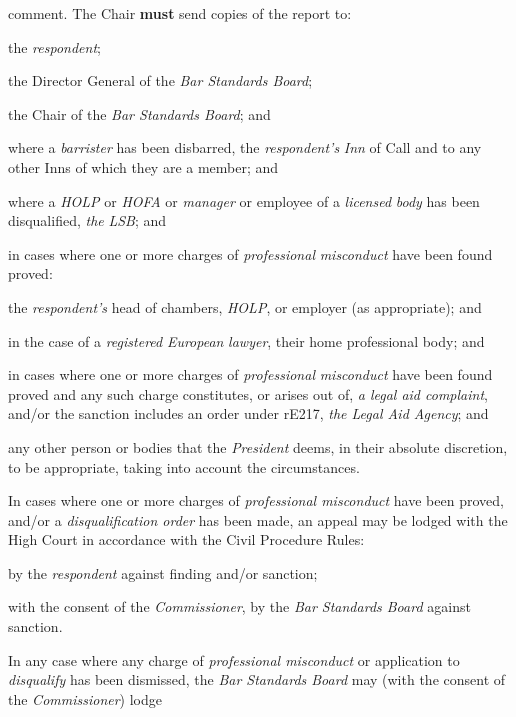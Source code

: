 comment. The Chair  \textcolor{myred}{\textbf{must}} send copies of the report to:\\\nl \item the \emph{respondent};\item the Director General of the \emph{Bar Standards Board};\item the Chair of the \emph{Bar Standards Board}; and\item where a \emph{barrister} has been disbarred,
the \emph{respondent's} \emph{Inn} of Call and to any other Inns of
which they are a member; and\item where a \emph{HOLP} or \emph{HOFA} or \emph{manager} or employee of
a \emph{licensed} \emph{body} has been
disqualified, \emph{the} \emph{LSB}; and\item in cases where one or more charges
of \emph{professional} \emph{misconduct} have been found proved:\al
\item the \emph{respondent's} head of chambers, \emph{HOLP}, or employer
(as appropriate); and\\
\item  in the case of a \emph{registered} \emph{European} \emph{lawyer},
their home professional body; and\la \item in cases where one or more charges
of \emph{professional} \emph{misconduct} have been found proved and any
such charge constitutes, or arises out of, \emph{a legal aid complaint},
and/or the sanction includes an order under rE217, \emph{the Legal Aid
Agency}; and\item any other person or bodies that the \emph{President} deems, in their
absolute discretion, to be appropriate, taking into account the
circumstances.\ln
{}\par
{}
In cases where one or more charges of \emph{professional
misconduct} have been proved, and/or a \emph{disqualification order} has
been made, an appeal may be lodged with the High Court in accordance
with the Civil Procedure Rules:\\\nl \item by the \emph{respondent} against finding and/or sanction;\item with the consent of the\emph{ Commissioner}, by the \emph{Bar
Standards Board} against sanction.\ln
{}\par
In any case where any charge of \emph{professional misconduct} or
application to \emph{disqualify} has been dismissed, the \emph{Bar
Standards Board} may (with the consent of the\emph{ Commissioner}) lodge
